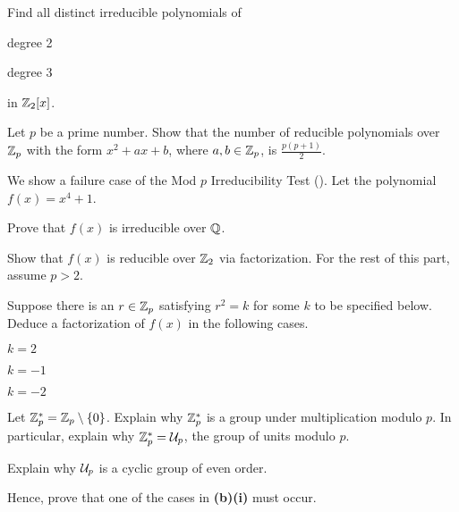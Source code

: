 \begin{problem}
    Find all distinct irreducible polynomials of
    \begin{partquestions}{\alph*}
        \item degree 2
        \item degree 3
    \end{partquestions}
    in $\mathbb{Z}_2[x]$.
\end{problem}

\begin{problem}
    Let $p$ be a prime number. Show that the number of reducible polynomials over $\mathbb{Z}_p$ with the form $x^2 + ax + b$, where $a,b \in \mathbb{Z}_p$, is $\frac{p(p+1)}2$.
\end{problem}

\begin{problem}\label{problem-failure-case-of-mod-p-irreducibility-test}
    We show a failure case of the Mod $p$ Irreducibility Test (). Let the polynomial $f(x) = x^4 + 1$.
    \begin{partquestions}{\alph*}
        \item Prove that $f(x)$ is irreducible over $\mathbb{Q}$.
        \item Show that $f(x)$ is reducible over $\mathbb{Z}_2$ via factorization.\newline
        For the rest of this part, assume $p > 2$.
        \begin{partquestions}{\roman*}
            \item Suppose there is an $r \in \mathbb{Z}_p$ satisfying $r^2 = k$ for some $k$ to be specified below. Deduce a factorization of $f(x)$ in the following cases.
            \begin{partquestions}{\alph*}
                \item $k = 2$
                \item $k = -1$
                \item $k = -2$
            \end{partquestions}
            \item Let $\mathbb{Z}_p^\ast = \mathbb{Z}_p \setminus \{0\}$. Explain why $\mathbb{Z}_p^\ast$ is a group under multiplication modulo $p$. In particular, explain why $\mathbb{Z}_p^\ast = \mathcal{U}_{p}$, the group of units modulo $p$.
            \item Explain why $\mathcal{U}_{p}$ is a cyclic group of even order.
            \item Hence, prove that one of the cases in \textbf{(b)(i)} must occur.
        \end{partquestions}
    \end{partquestions}
\end{problem}
